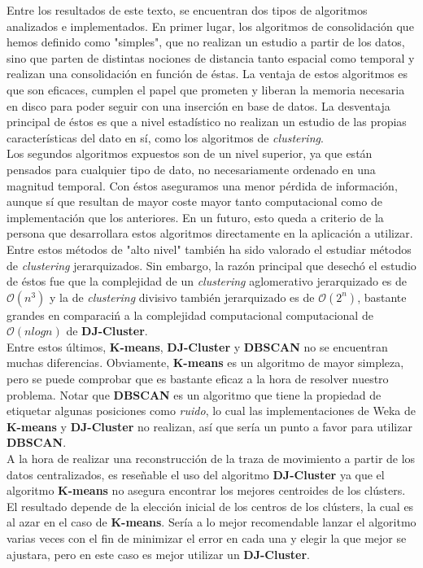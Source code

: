 \documentclass[a4paper, 12pt]{article}
\begin{document}
Entre los resultados de este texto, se encuentran dos tipos de algoritmos analizados e implementados. En primer lugar, los algoritmos de consolidaci\'on que hemos definido como "simples", que no realizan un estudio a partir de los datos, sino que parten de distintas nociones de distancia tanto espacial como temporal y realizan una consolidaci\'on en funci\'on de \'estas. La ventaja de estos algoritmos es que son eficaces, cumplen el papel que prometen y liberan la memoria necesaria en disco para poder seguir con una inserci\'on en base de datos. La desventaja principal de \'estos es que a nivel estad\'istico no realizan un estudio de las propias caracter\'isticas del dato en s\'i, como los algoritmos de \textit{clustering}.\\

Los segundos algoritmos expuestos son de un nivel superior, ya que est\'an pensados para cualquier tipo de dato, no necesariamente ordenado en una magnitud temporal. Con \'estos aseguramos una menor p\'erdida de informaci\'on, aunque s\'i que resultan de mayor coste mayor tanto computacional como de implementaci\'on que los anteriores. En un futuro, esto queda a criterio de la persona que desarrollara estos algoritmos directamente en la aplicaci\'on a utilizar. \\

Entre estos m\'etodos de "alto nivel" tambi\'en ha sido valorado el estudiar m\'etodos de \textit{clustering} jerarquizados. Sin embargo, la raz\'on principal que desech\'o el estudio de \'estos fue que la complejidad de un \textit{clustering} aglomerativo jerarquizado es de $\mathcal{O}(n^3)$ y la de \textit{clustering} divisivo tambi\'en jerarquizado es de $\mathcal{O}(2^n)$, bastante grandes en comparaci\'n a la complejidad computacional computacional de $\mathcal{O}(n log n)$ de \textbf{DJ-Cluster}.\\

Entre estos \'ultimos, \textbf{K-means}, \textbf{DJ-Cluster} y \textbf{DBSCAN} no se encuentran muchas diferencias. Obviamente, \textbf{K-means} es un algoritmo de mayor simpleza, pero se puede comprobar que es bastante eficaz a la hora de resolver nuestro problema. Notar que \textbf{DBSCAN} es un algoritmo que tiene la propiedad de etiquetar algunas posiciones como \textit{ruido}, lo cual las implementaciones de Weka de \textbf{K-means} y \textbf{DJ-Cluster} no realizan, as\'i que ser\'ia un punto a favor para utilizar \textbf{DBSCAN}.\\

A la hora de realizar una reconstrucci\'on de la traza de movimiento a partir de los datos centralizados, es rese\~nable el uso del algoritmo \textbf{DJ-Cluster} ya que el algoritmo \textbf{K-means} no asegura encontrar los mejores centroides de los cl\'usters. El resultado depende de la elecci\'on inicial de los centros de los cl\'usters, la cual es al azar en el caso de \textbf{K-means}. Ser\'ia a lo mejor recomendable lanzar el algoritmo varias veces con el fin de minimizar el error en cada una y elegir la que mejor se ajustara, pero en este caso es mejor utilizar un \textbf{DJ-Cluster}. \\
\end{document}
